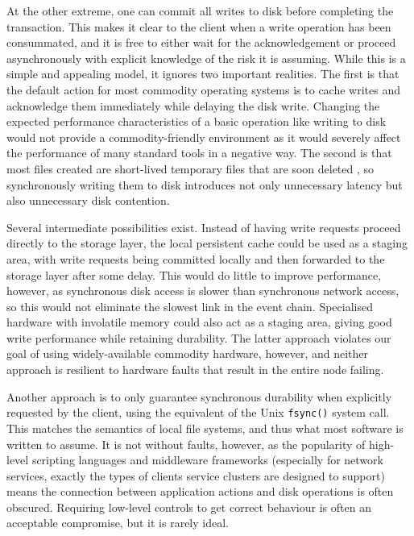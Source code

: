 At the other extreme, one can commit all writes to disk before completing the transaction. This makes it clear to the client when a write operation has been consummated, and it is free to either wait for the acknowledgement or proceed asynchronously with explicit knowledge of the risk it is assuming. While this is a simple and appealing model, it ignores two important realities. The first is that the default action for most commodity operating systems is to cache writes and acknowledge them immediately while delaying the disk write. Changing the expected performance characteristics of a basic operation like writing to disk would not provide a commodity-friendly environment as it would severely affect the performance of many standard tools in a negative way. The second is that most files created are short-lived temporary files that are soon deleted \cite{ousterhout}, so synchronously writing them to disk introduces not only unnecessary latency but also unnecessary disk contention.

Several intermediate possibilities exist. Instead of having write requests proceed directly to the storage layer, the local persistent cache could be used as a staging area, with write requests being committed locally and then forwarded to the storage layer after some delay. This would do little to improve performance, however, as synchronous disk access is slower than synchronous network access, so this would not eliminate the slowest link in the event chain. Specialised hardware with involatile memory could also act as a staging area, giving good write performance while retaining durability. The latter approach violates our goal of using widely-available commodity hardware, however, and neither approach is resilient to hardware faults that result in the entire node failing.

Another approach is to only guarantee synchronous durability when explicitly requested by the client, using the equivalent of the Unix \texttt{fsync()} system call. This matches the semantics of local file systems, and thus what most software is written to assume. It is not without faults, however, as the popularity of high-level scripting languages and middleware frameworks (especially for network services, exactly the types of clients service clusters are designed to support) means the connection between application actions and disk operations is often obscured. Requiring low-level controls to get correct behaviour is often an acceptable compromise, but it is rarely ideal.

